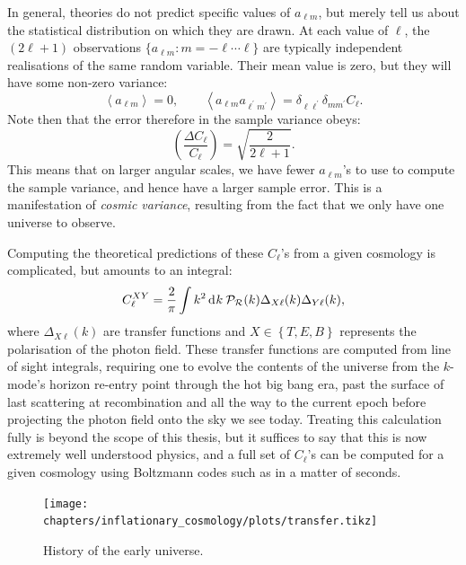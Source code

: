 In general, theories do not predict specific values of $a_{\ell m}$, but merely tell us about the statistical distribution on which they are drawn. At each value of $\ell$, the $(2\ell + 1)$ observations $\{a_{\ell m}:m=-\ell\cdots\ell\}$ are typically independent realisations of the same random variable. Their mean value is zero, but they will have some non-zero variance:
\begin{equation}
  \left\langle a_{\ell m} \right\rangle = 0, \qquad
  \left\langle a_{\ell m} a_{\ell^\prime m^\prime}\right\rangle = \delta_{\ell \ell^\prime} \delta_{m m^\prime} C_\ell.
\end{equation}
Note then that the error therefore in the sample variance obeys:
\begin{equation}
  \left( \frac{\Delta C_\ell}{C_\ell} \right) = \sqrt{\frac{2}{2\ell+1}}.
\end{equation}
This means that on larger angular scales, we have fewer $a_{\ell m}$'s to use to compute the sample variance, and hence have a larger sample error. This is a manifestation of {\em cosmic variance}, resulting from the fact that we only have one universe to observe. 

Computing the theoretical predictions of these $C_\ell$'s from a given cosmology is complicated, but amounts to an integral:
\begin{equation}
  C_\ell^{XY} = \frac{2}{\pi}\int k^2 \operatorname{d}^{}\!{k} \: \mathcal{P}_\mathcal{R}(k) \Delta_{X\ell}(k)\Delta_{Y\ell}(k),
\end{equation}
where $\Delta_{X\ell}(k)$ are transfer functions and ${X\in\left\{ T,E,B \right\}}$ represents the polarisation of the photon field. These transfer functions are computed from line of sight integrals, requiring one to evolve the contents of the universe from the $k$-mode's horizon re-entry point through the hot big bang era, past the surface of last scattering at recombination and all the way to the current epoch before projecting the photon field onto the sky we see today. Treating this calculation fully is beyond the scope of this thesis, but it suffices to say that this is now extremely well understood physics, and a full set of $C_\ell$'s can be computed for a given cosmology using Boltzmann codes such as \CAMB{} in a matter of seconds.

\begin{figure}[tp]
  \centering
  \texttt{[image: chapters/inflationary\_cosmology/plots/transfer.tikz]}
  \caption{History of the early universe.\label{fig:cos:transfer}}
\end{figure}

